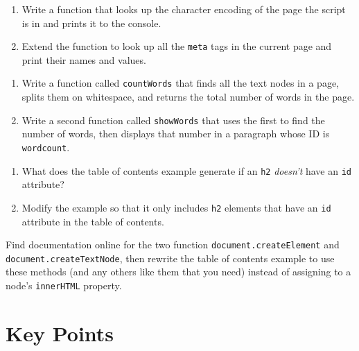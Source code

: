 
\begin{enumerate}
\item
  Write a function that looks up the character encoding of the page the script is in
  and prints it to the console.
\item
  Extend the function to look up all the \texttt{meta} tags in the current page
  and print their names and values.
\end{enumerate}


\begin{enumerate}
\item
  Write a function called \texttt{countWords} that finds all the text nodes in a page,
  splits them on whitespace,
  and returns the total number of words in the page.
\item
  Write a second function called \texttt{showWords} that uses the first to find the number of words,
  then displays that number in a paragraph whose ID is \texttt{wordcount}.
\end{enumerate}


\begin{enumerate}
\item
  What does the table of contents example generate if an \texttt{h2} \emph{doesn't} have an \texttt{id} attribute?
\item
  Modify the example so that it only includes \texttt{h2} elements that have an \texttt{id} attribute
  in the table of contents.
\end{enumerate}


Find documentation online for the two function
\texttt{document.createElement} and \texttt{document.createTextNode},
then rewrite the table of contents example to use these methods
(and any others like them that you need)
instead of assigning to a node's \texttt{innerHTML} property.

\section*{Key Points}


